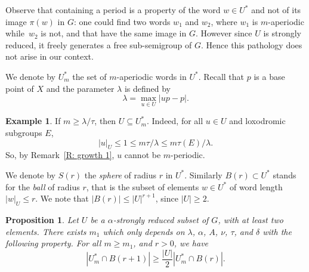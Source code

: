 \documentclass[11pt]{article}
\theoremstyle{plain}
\newtheorem{prop}[thm]{Proposition}
\theoremstyle{definition}
\newtheorem{ex}[thm]{Example}
\begin{document}
Observe that containing a period is a property of the word $w \in U^*$ and not of its image $\pi(w)$ in $G$:
one could find two words $w_1$ and $w_2$, where $w_1$ is $m$-aperiodic while~$w_2$ is not, and that have the same image in $G$.
However since $U$ is strongly reduced, it freely generates a free sub-semigroup of $G$.
Hence this pathology does not arise in our context.

We denote by $U^*_m$ the set of $m$-aperiodic words in $U^*$.
Recall that $p$ is a base point of $X$ and the parameter $\lambda$ is defined by
\begin{equation*}
\lambda = \max_{u \in U} | up - p|.
\end{equation*}

\begin{ex}\label{E: proper power} If $m \geq \lambda/\tau$, then $U\subseteq U^*_m$.
Indeed, for all $u\in U$ and loxodromic subgroups $E$,
\[
|u|_U \leq 1 \leq m\tau/\lambda \leq m \tau(E)/\lambda.
\]
So, by Remark~\ref{R: growth 1}, $u$ cannot be $m$-periodic.
\end{ex}

We denote by $S(r)$ the \emph{sphere} of radius $r$ in $U^*$.
Similarly $B(r) \subset U^*$ stands for the \emph{ball} of radius $r$, that is the subset of elements $w\in U^*$ of word length $|w|_U \leqslant r$.
We note that $|B(r)|\leqslant |U|^{r+1}$, since $|U| \geq 2$.

\begin{prop}\label{P: aperiodic counting}
Let $U$ be a $\alpha$-strongly reduced subset of $G$, with at least two elements.
There exists $m_1$ which only depends on $\lambda$, $\alpha$, $A$, $\nu$, $\tau$, and $\delta$ with the following property.
For all $m \geq m_1$, and $r>0$, we have
\[
|U^*_m \cap B(r+1)| \geqslant \frac{|U|}2 |U^*_m \cap B(r)|.
\]
\end{prop}
\end{document}

